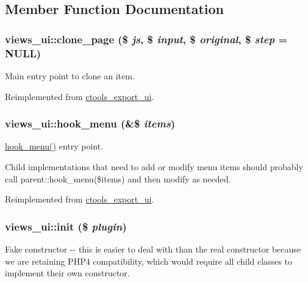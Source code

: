 \subsection{Member Function Documentation}
\hypertarget{classviews__ui_a5c8914e69b780b3257c15e635f39699c}{
\subsubsection[{clone\_\-page}]{\setlength{\rightskip}{0pt plus 5cm}views\_\-ui::clone\_\-page (\$ {\em js}, \/  \$ {\em input}, \/  \$ {\em original}, \/  \$ {\em step} = {\ttfamily NULL})}}
\label{classviews__ui_a5c8914e69b780b3257c15e635f39699c}
Main entry point to clone an item. 

Reimplemented from \hyperlink{classctools__export__ui_a20bcb4d94dd7450de286084cd3dd6e99}{ctools\_\-export\_\-ui}.\hypertarget{classviews__ui_a2a5885b9b860fd53a304e1ac38237a56}{
\subsubsection[{hook\_\-menu}]{\setlength{\rightskip}{0pt plus 5cm}views\_\-ui::hook\_\-menu (\&\$ {\em items})}}
\label{classviews__ui_a2a5885b9b860fd53a304e1ac38237a56}
\hyperlink{classviews__ui_a2a5885b9b860fd53a304e1ac38237a56}{hook\_\-menu()} entry point.

Child implementations that need to add or modify menu items should probably call parent::hook\_\-menu(\$items) and then modify as needed. 

Reimplemented from \hyperlink{classctools__export__ui_a5ee980ee59378fdeb612e429e18f08c7}{ctools\_\-export\_\-ui}.\hypertarget{classviews__ui_aaa0602d4d7f77dc16eb57cc910aa87ac}{
\subsubsection[{init}]{\setlength{\rightskip}{0pt plus 5cm}views\_\-ui::init (\$ {\em plugin})}}
\label{classviews__ui_aaa0602d4d7f77dc16eb57cc910aa87ac}
Fake constructor -\/-\/ this is easier to deal with than the real constructor because we are retaining PHP4 compatibility, which would require all child classes to implement their own constructor. 

